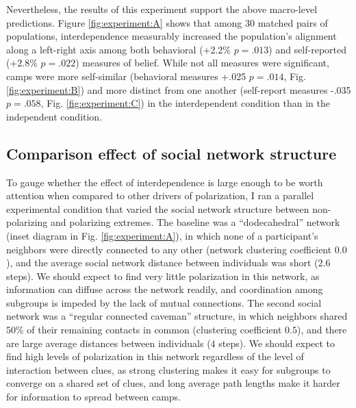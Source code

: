 \documentclass[9pt,twocolumn,twoside,lineno]{pnas-new}
\begin{document}
Nevertheless, the results of this experiment support the above macro-level predictions. Figure \ref{fig:experiment:A} shows that among 30 matched pairs of populations, interdependence measurably increased the population’s alignment along a left-right axis among both behavioral (+2.2\% $p=.013$) and self-reported (+2.8\% $p=.022$) measures of belief. While not all measures were significant, camps were more self-similar (behavioral measures +.025 $p=.014$, Fig. \ref{fig:experiment:B}) and more distinct from one another (self-report measures -.035 $p=.058$, Fig. \ref{fig:experiment:C}) in the interdependent condition than in the independent condition.

\subsection*{Comparison effect of social network structure}
To gauge whether the effect of interdependence is large enough to be worth attention when compared to other drivers of polarization, I ran a parallel experimental condition that varied the social network structure between non-polarizing and polarizing extremes. The baseline was a “dodecahedral” network (inset diagram in Fig. \ref{fig:experiment:A}), in which none of a participant’s neighbors were directly connected to any other (network clustering coefficient $0.0$), and the average social network distance between individuals was short ($2.6$ steps). We should expect to find very little polarization in this network, as information can diffuse across the network readily, and coordination among subgroups is impeded by the lack of mutual connections. The second social network was a “regular connected caveman” structure, in which neighbors shared $50\%$ of their remaining contacts in common (clustering coefficient $0.5$), and there are large average distances between individuals ($4$ steps). We should expect to find high levels of polarization in this network regardless of the level of interaction between clues, as strong clustering makes it easy for subgroups to converge on a shared set of clues, and long average path lengths make it harder for information to spread between camps. 
\end{document}

